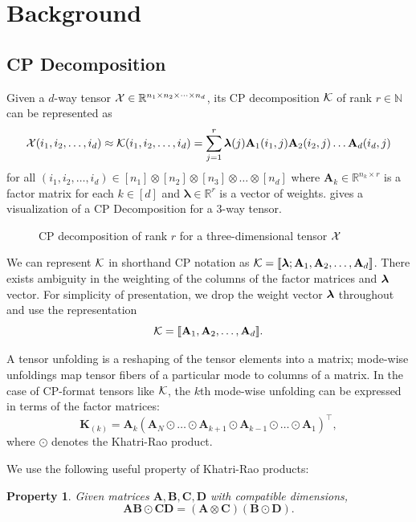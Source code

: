 \documentclass{article}
\newtheorem{property}{Property}
\newcommand{\mat}[1]{\mathbf{#1}}
\newcommand{\V}[2][]{\bm{#1{\mathbf{\MakeLowercase{#2}}}}} 		%
\newcommand{\T}[2][]{#1{\mathbf{\cal{#2}}}} 						%
\begin{document}
\section{Background} 
\label{sec:background}

\subsection{CP Decomposition}
Given a $d$-way tensor $\T{X} \in \mathbb{R}^{n_1\times n_2\times \dots \times n_d}$, its
CP decomposition $\T{K}$ of rank $r \in \mathbb{N}$ can be represented as 
\begin{equation}
\label{eq:CP}
\T{X}(i_1,i_2,\dots, i_d) \approx \T{K}(i_1, i_2,\dots, i_d) = \sum^{r}_{j=1} \V{\lambda}(j) \mat{A}_1(i_1,j)\mat{A}_2(i_2,j) \dots \mat{A}_d(i_d,j)
\end{equation}
for all $(i_1,i_2,\dots, i_d) \in [n_1] \otimes [n_2] \otimes [n_3] \otimes \dots \otimes [n_d]$ where $\mat{A}_k \in \mathbb{R}^{n_k \times r}$ is a factor matrix for each $k \in [d]$ and $\bm{\lambda}\in\mathbb{R}^r$ is a vector of weights. 
 gives a visualization of a CP Decomposition for a 3-way tensor.

\begin{figure}[ht!]
\centering

\caption{CP decomposition of rank $r$ for a three-dimensional tensor $\T{X}$ \label{fig:3d-cp-decomp}}
\end{figure}
We can represent $\T[]{K}$ in shorthand CP notation as $\T{K} = [\![\V{\lambda};\mat{A}_1,\mat{A}_2, \dots,\mat{A}_d ]\!]$. 
There exists ambiguity in the weighting of the columns of the factor matrices and $\V{\lambda}$ vector.
For simplicity of presentation, we drop the weight vector $\V{\lambda}$ throughout and use the representation
$$\T{K} = [\![\mat{A}_1,\mat{A}_2, \dots,\mat{A}_d ]\!].$$

A tensor unfolding is a reshaping of the tensor elements into a matrix; mode-wise unfoldings map tensor fibers of a particular mode to columns of a matrix.
In the case of CP-format tensors like $\T{K}$, the $k$th mode-wise unfolding can be expressed in terms of the factor matrices:
$$\mat{K}_{(k)} = \mat{A}_k (\mat{A}_N \odot \dots \odot \mat{A}_{k+1} \odot \mat{A}_{k-1} \odot \dots \odot \mat{A}_1)^\top,$$
where $\odot$ denotes the Khatri-Rao product.

We use the following useful property of Khatri-Rao products:
\begin{property}
\label{prop:krnkrp}
Given matrices $\mat{A},\mat{B},\mat{C},\mat{D}$ with compatible dimensions, 
$$\mat{A}\mat{B} \odot \mat{C}\mat{D} = (\mat{A} \otimes \mat{C}) (\mat{B} \odot \mat{D}).$$
\end{property}
\end{document}

